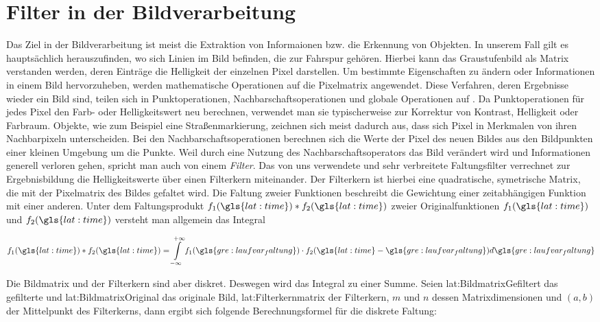 \section{Filter in der Bildverarbeitung} \label{sec:filter}

Das Ziel in der Bildverarbeitung ist meist die Extraktion von Informaionen bzw. die Erkennung von Objekten. In unserem Fall gilt es hauptsächlich herauszufinden, wo sich Linien im Bild befinden, die zur Fahrspur gehören. Hierbei kann das Graustufenbild als Matrix verstanden werden, deren Einträge die Helligkeit der einzelnen Pixel darstellen. Um bestimmte Eigenschaften zu ändern oder Informationen in einem Bild hervorzuheben, werden mathematische Operationen auf die Pixelmatrix angewendet. Diese Verfahren, deren Ergebnisse wieder ein Bild sind, teilen sich in Punktoperationen, Nachbarschaftsoperationen und globale Operationen auf \autocite{jaehneDigitaleBildverarbeitungMit2005}. Da Punktoperationen für jedes Pixel den Farb- oder Helligkeitswert neu berechnen, verwendet man sie typischerweise zur Korrektur von Kontrast, Helligkeit oder Farbraum. Objekte, wie zum Beispiel eine Straßenmarkierung, zeichnen sich meist dadurch aus, dass sich Pixel in Merkmalen von ihren Nachbarpixeln unterscheiden. Bei den Nachbarschaftsoperationen berechnen sich die Werte der Pixel des neuen Bildes aus den Bildpunkten einer kleinen Umgebung um die Punkte. Weil durch eine Nutzung des Nachbarschaftsoperators das Bild verändert wird und Informationen generell verloren gehen, spricht man auch von einem \emph{Filter}. Das von uns verwendete und sehr verbreitete Faltungsfilter verrechnet zur Ergebnisbildung die Helligkeitswerte über einen Filterkern miteinander. Der Filterkern ist hierbei eine quadratische, symetrische Matrix, die mit der Pixelmatrix des Bildes gefaltet wird. Die Faltung zweier Funktionen beschreibt die Gewichtung einer zeitabhängigen Funktion mit einer anderen. Unter dem Faltungsprodukt \( f_1(\gls{lat:time}) \ast f_2(\gls{lat:time}) \) zweier Originalfunktionen \(f_1(\gls{lat:time}) \) und \(f_2(\gls{lat:time}) \) versteht man allgemein das Integral \autocite{papulaMathematikFuerIngenieure}

\begin{equation}
f_1(\gls{lat:time}) \ast f_2(\gls{lat:time}) = \int \limits_{-\infty}^{+\infty} f_1(\gls{gre:laufvar_faltung}) \cdot f_2(\gls{lat:time}-\gls{gre:laufvar_faltung})d\gls{gre:laufvar_faltung}
\end{equation}

 Die Bildmatrix und der Filterkern sind aber diskret. Deswegen wird das Integral zu einer Summe. Seien \gls{lat:BildmatrixGefiltert} das gefilterte und \gls{lat:BildmatrixOriginal} das originale Bild, \gls{lat:Filterkernmatrix} der Filterkern, \(m\) und \(n\) dessen Matrixdimensionen und \( (a,b) \) der Mittelpunkt des Filterkerns, dann ergibt sich folgende Berechnungsformel für die diskrete Faltung:


